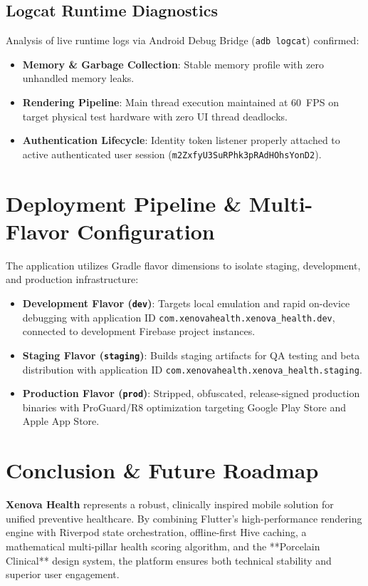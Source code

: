 \documentclass[12pt,a4paper]{article}
\begin{document}
\subsection{Logcat Runtime Diagnostics}
Analysis of live runtime logs via Android Debug Bridge (\texttt{adb logcat}) confirmed:
\begin{itemize}[leftmargin=1.5em]
    \item \textbf{Memory \& Garbage Collection}: Stable memory profile with zero unhandled memory leaks.
    \item \textbf{Rendering Pipeline}: Main thread execution maintained at 60~FPS on target physical test hardware with zero UI thread deadlocks.
    \item \textbf{Authentication Lifecycle}: Identity token listener properly attached to active authenticated user session (\nolinkurl{m2ZxfyU3SuRPhk3pRAdHOhsYonD2}).
\end{itemize}

\section{Deployment Pipeline \& Multi-Flavor Configuration}
The application utilizes Gradle flavor dimensions to isolate staging, development, and production infrastructure:
\begin{itemize}[leftmargin=1.5em]
    \item \textbf{Development Flavor (\texttt{dev})}: Targets local emulation and rapid on-device debugging with application ID \nolinkurl{com.xenovahealth.xenova_health.dev}, connected to development Firebase project instances.
    \item \textbf{Staging Flavor (\texttt{staging})}: Builds staging artifacts for QA testing and beta distribution with application ID \nolinkurl{com.xenovahealth.xenova_health.staging}.
    \item \textbf{Production Flavor (\texttt{prod})}: Stripped, obfuscated, release-signed production binaries with ProGuard/R8 optimization targeting Google Play Store and Apple App Store.
\end{itemize}

\section{Conclusion \& Future Roadmap}
\textbf{Xenova Health} represents a robust, clinically inspired mobile solution for unified preventive healthcare. By combining Flutter's high-performance rendering engine with Riverpod state orchestration, offline-first Hive caching, a mathematical multi-pillar health scoring algorithm, and the **Porcelain Clinical** design system, the platform ensures both technical stability and superior user engagement. 
\end{document}
